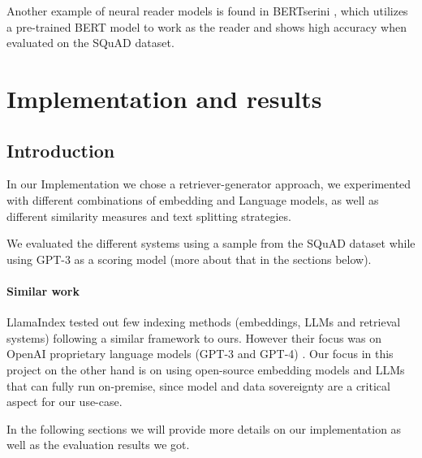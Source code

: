 \documentclass[a4paper,12pt]{article}
\begin{document}
Another example of neural reader models is found in BERTserini \cite{BERTserini}, which utilizes a pre-trained BERT model to work as the reader and shows high accuracy when evaluated on the SQuAD \cite{squad} dataset.
\clearpage
\section{Implementation and results}
\subsection{Introduction}
In our Implementation we chose a retriever-generator approach, we experimented with different combinations of embedding and Language models, as well as different similarity measures and text splitting strategies.

We evaluated the different systems using a sample from the SQuAD \cite{squad} dataset while using GPT-3 \cite{gpt3} as a scoring model (more about that in the sections below).  

\paragraph*{Similar work} LlamaIndex \cite{llamaindex} tested out few indexing methods (embeddings, LLMs and retrieval systems) following a similar framework to ours. 
However their focus was on OpenAI proprietary language models (GPT-3 and GPT-4) \cite{gpt3, gpt4}. Our focus in this project 
on the other hand is on using open-source embedding models and LLMs that can fully run on-premise, since model and data sovereignty are a critical aspect for our use-case.

In the following sections we will provide more details on our implementation as well as the evaluation results we got.
\end{document}
